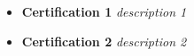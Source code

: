 \begin {itemize}
	\item
		\textbf {Certification 1} \textit {description 1}
	\item

		\textbf {Certification 2} \textit {description 2}
\end {itemize}


